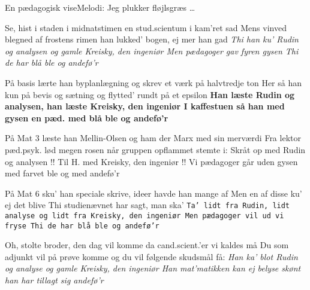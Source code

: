 \begin{sang}{En pædagogisk vise}{Melodi: Jeg plukker fløjlsgræs \ldots}
\begin{vers}
Se, hist i staden i midnatstimen 
en stud.scientum i kam'ret sad 
Mens vinved blegned af frostens rimen 
han lukked' bogen, ej mer han gad 
{\sl Thi han ku' Rudin og analysen 
og gamle Kreisky, den ingeniør 
Men pædagoger gav fyren gysen 
Thi de har blå ble og andefø'r}
\end{vers}
\begin{vers}
På basis lærte han byplanlægning 
og skrev et værk på halvtredje ton 
Her så han kun på bevis og sætning 
og flytted' rundt på et epsilon 
{\bf Han læste Rudin og analysen, 
han læste Kreisky, den ingeniør 
I kaffestuen så han med gysen 
en pæd. med blå ble og andefø'r }
\end{vers}
\begin{vers}
På Mat 3 læste han Mellin-Olsen 
og ham der Marx med sin merværdi 
Fra lektor pæd.psyk. lød megen rosen 
når gruppen opflammet stemte i: 
{\sf Skråt op med Rudin og analysen !! 
Til H. med Kreisky, den ingeniør !! 
Vi pædagoger går uden gysen 
med farvet ble og med andefø'r }
\end{vers}
\begin{vers}
På Mat 6 sku' han speciale skrive, 
ideer havde han mange af 
Men en af disse ku' ej det blive 
Thi studienævnet har sagt, man ska' 
{\tt \small Ta' lidt fra Rudin, lidt analyse 
og lidt fra Kreisky, den ingeniør 
Men pædagoger vil ud vi fryse 
Thi de har blå ble og andefø'r }
\end{vers}
\begin{vers}
Oh, stolte broder, den dag vil komme 
da cand.scient.'er vi kaldes må 
Du som adjunkt vil på prøve komme 
og du vil følgende skudsmål få: 
{\em Han ka' blot Rudin og analyse 
og gamle Kreisky, den ingeniør 
Han mat'matikken kan ej belyse 
skønt han har tillagt sig andefø'r }
\end{vers}
\end{sang}